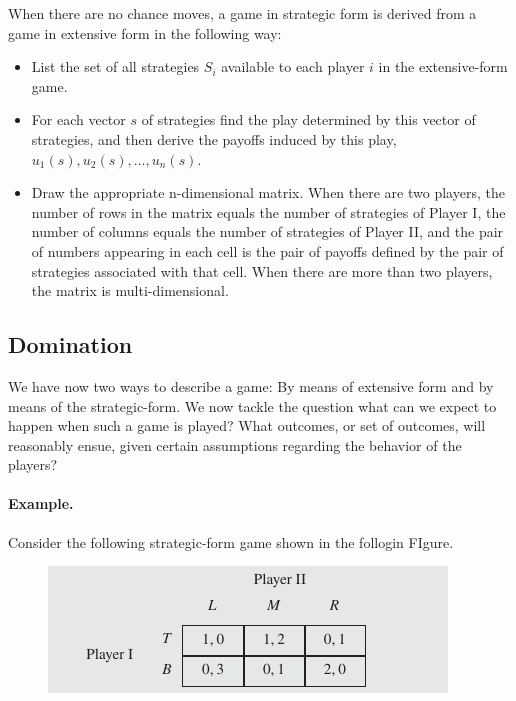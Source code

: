 When there are no chance moves, a game in strategic form is derived from a game in extensive form in the following way:

\begin{itemize}
	\item List the set of all strategies $S_i$ available to each player $i$ in the extensive-form game.
	\item For each vector $s$ of strategies find the play determined by this vector of strategies, and then derive the payoffs induced by this play, $u_1(s), u_2(s), \ldots, u_n(s)$.
	\item Draw the appropriate n-dimensional matrix. When there are two players, the number of rows in the matrix equals the number of strategies of Player I, the number of columns equals the number of strategies of Player II, and the pair of numbers appearing in each cell is the pair of payoffs defined by the pair of strategies associated with that cell. When there are more than two players, the matrix is multi-dimensional.
\end{itemize}

\subsection{Domination}

We have now two ways to describe a game: By means of extensive form and by means of the strategic-form. We now tackle the question what can we expect to happen when such a game is played? What outcomes, or set of outcomes, will reasonably ensue, given certain assumptions regarding the behavior of the players?

\paragraph{Example.} Consider the following strategic-form game shown in the follogin FIgure.

\begin{figure}[H]
    \centering
    \includegraphics[scale=0.5]{images/2023-10-10-game_theory_10.png}
\end{figure}


